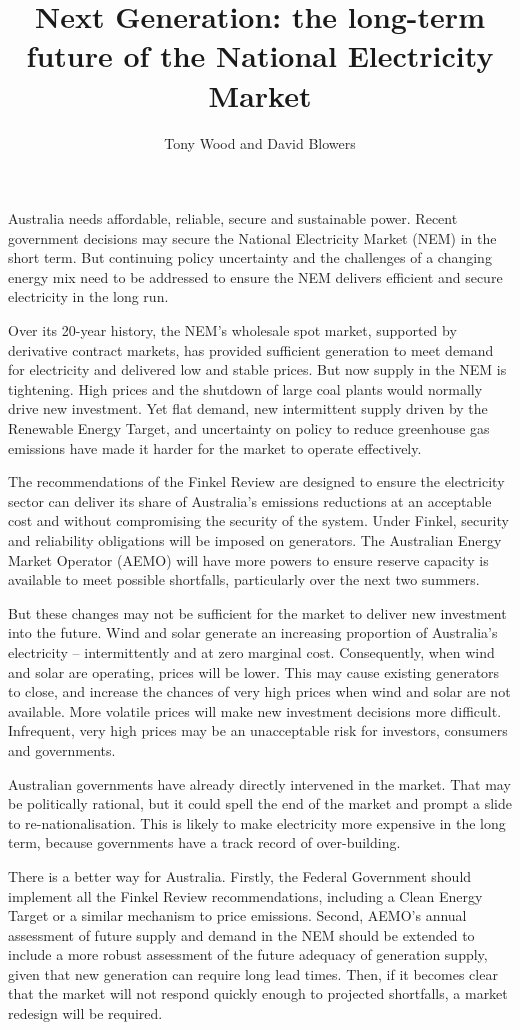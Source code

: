 \documentclass[FrontPage]{grattan}
\author{Tony Wood and David Blowers}
\title{Next Generation: the long-term future of the National Electricity Market}
\begin{document}
\begin{overview}
Australia needs affordable, reliable, secure and sustainable power. Recent government decisions may secure the National Electricity Market (NEM) in the short term. But continuing policy uncertainty and the challenges of a changing energy mix need to be addressed to ensure the NEM delivers efficient and secure electricity in the long run.

Over its 20-year history, the NEM's wholesale spot market, supported by derivative contract markets, has provided sufficient generation to meet demand for electricity and delivered low and stable prices. But now supply in the NEM is tightening. High prices and the shutdown of large coal plants would normally drive new investment. Yet flat demand, new intermittent supply driven by the Renewable Energy Target, and uncertainty on policy to reduce greenhouse gas emissions have made it harder for the market to operate effectively.

The recommendations of the Finkel Review are designed to ensure the electricity sector can deliver its share of Australia’s emissions reductions at an acceptable cost and without compromising the security of the system. Under Finkel, security and reliability obligations will be imposed on generators. The Australian Energy Market Operator (AEMO) will have more powers to ensure reserve capacity is available to meet possible shortfalls, particularly over the next two summers.

But these changes may not be sufficient for the market to deliver new investment into the future. Wind and solar generate an increasing proportion of Australia’s electricity – intermittently and at zero marginal cost. Consequently, when wind and solar are operating, prices will be lower. This may cause existing generators to close, and increase the chances of very high prices when wind and solar are not available. More volatile prices will make new investment decisions more difficult. Infrequent, very high prices may be an unacceptable risk for investors, consumers and governments.

Australian governments have already directly intervened in the market. That may be politically rational, but it could spell the end of the market and prompt a slide to re-nationalisation. This is likely to make electricity more expensive in the long term, because governments have a track record of over-building.

There is a better way for Australia. Firstly, the Federal Government should implement all the Finkel Review recommendations, including a Clean Energy Target or a similar mechanism to price emissions. Second, AEMO's annual assessment of future supply and demand in the NEM should be extended to include a more robust assessment of the future adequacy of generation supply, given that new generation can require long lead times. Then, if it becomes clear that the market will not respond quickly enough to projected shortfalls, a market redesign will be required.


\end{overview}
\end{document}
